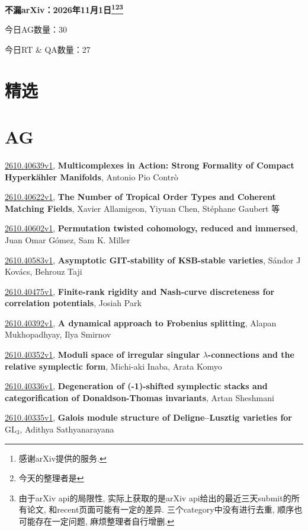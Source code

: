 \documentclass[9pt, a4paper]{article}
\theoremstyle{plain}
\theoremstyle{definition}
\theoremstyle{remark}
\newcommand{\arxiv}[3]{\href{https://arxiv.org/abs/#1}{#1}, \textbf{\textcolor{arxivblue}{#2}}, #3}
\newcommand{\AGnumber}{30}
\newcommand{\RTQAnumber}{27}
\newcommand{\NewestDate}{2026年11月1日}
\newcommand{\todayarXiver}{} %
\begin{document}
\begin{center}
    \Huge\textbf{不漏arXiv：\NewestDate\footnote{感谢arXiv提供的服务.}\footnote{今天的整理者是\todayarXiver}\footnote{由于arXiv api的局限性, 实际上获取的是arXiv api给出的最近三天submit的所有论文, 和recent页面可能有一定的差异. 三个category中没有进行去重, 顺序也可能存在一定问题, 麻烦整理者自行增删.}} \\
\end{center}

\setcounter{section}{-1}

\begin{center}
    今日AG数量：\AGnumber
    
    今日RT \& QA数量：\RTQAnumber
    
\end{center}


\section{精选}


\section{AG}
\arxiv{2610.40639v1}{Multicomplexes in Action: Strong Formality of Compact Hyperkähler Manifolds}{Antonio Pio Contrò}

\arxiv{2610.40622v1}{The Number of Tropical Order Types and Coherent Matching Fields}{Xavier Allamigeon, Yiyuan Chen, Stéphane Gaubert 等}

\arxiv{2610.40602v1}{Permutation twisted cohomology, reduced and immersed}{Juan Omar Gómez, Sam K. Miller}

\arxiv{2610.40583v1}{Asymptotic GIT-stability of KSB-stable varieties}{Sándor J Kovács, Behrouz Taji}

\arxiv{2610.40475v1}{Finite-rank rigidity and Nash-curve discreteness for correlation potentials}{Josiah Park}

\arxiv{2610.40392v1}{A dynamical approach to Frobenius splitting}{Alapan Mukhopadhyay, Ilya Smirnov}

\arxiv{2610.40352v1}{Moduli space of irregular singular $λ$-connections and the relative symplectic form}{Michi-aki Inaba, Arata Komyo}

\arxiv{2610.40336v1}{Degeneration of (-1)-shifted symplectic stacks and categorification of Donaldson-Thomas invariants}{Artan Sheshmani}

\arxiv{2610.40335v1}{Galois module structure of Deligne--Lusztig varieties for $\mathrm{GL}_3$}{Adithya Sathyanarayana}
\end{document}
